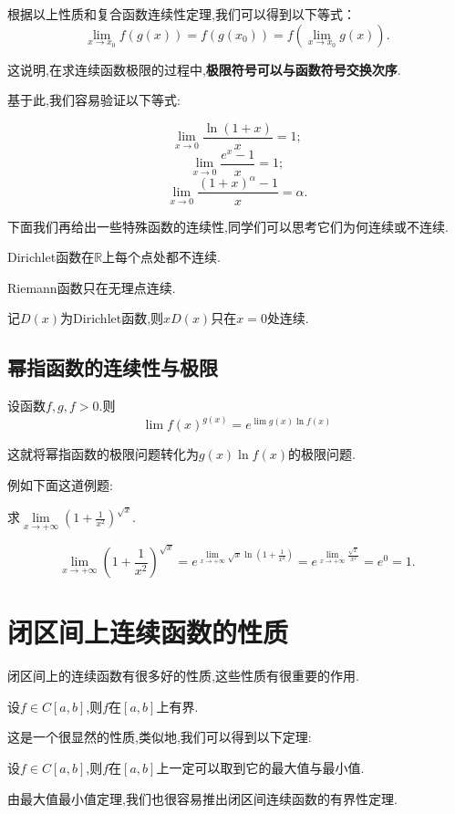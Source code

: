 根据以上性质和复合函数连续性定理,我们可以得到以下等式：
\[
	\lim_{x\to x_0}f(g(x))=f(g(x_0))=f(\lim_{x\to x_0}g(x)).
\]

这说明,在求连续函数极限的过程中,\textbf{极限符号可以与函数符号交换次序}.

基于此,我们容易验证以下等式:
\begin{example}
	\[
		\lim_{x\to 0}\frac{\ln{(1+x)}}{x}=1;
	\]\[
		\lim_{x\to 0}\frac{e^{x}-1}{x}=1;
	\]\[
		\lim_{x\to 0}\frac{(1+x)^{\alpha}-1}{x}=\alpha.
	\]
\end{example}

下面我们再给出一些特殊函数的连续性,同学们可以思考它们为何连续或不连续.
\begin{example}
	Dirichlet函数在$\mathbb{R}$上每个点处都不连续.
\end{example}
\begin{example}
	Riemann函数只在无理点连续.
\end{example}
\begin{example}
	记$D(x)$为Dirichlet函数,则$xD(x)$只在$x=0$处连续.
\end{example}

\subsection{幂指函数的连续性与极限}
设函数$f,g,f>0$.则
\[
	\lim f(x)^{g(x)}=e^{\lim g(x)\ln{f(x)}}
\]

这就将幂指函数的极限问题转化为$g(x)\ln f(x)$的极限问题.

例如下面这道例题:
\begin{example}
	求$\lim\limits_{x\to +\infty}(1+\frac{1}{x^2})^{\sqrt{x}}$.
\end{example}

\begin{solution}
	\[
		\lim_{x\to +\infty}(1+\frac{1}{x^2})^{\sqrt{x}}=e^{\lim\limits_{x\to +\infty}\sqrt{x}\ln{(1+\frac{1}{x^2})}}=e^{\lim\limits_{x\to +\infty}\frac{\sqrt{x}}{x^2}}=e^0=1.
	\]
\end{solution}

\section{闭区间上连续函数的性质}
闭区间上的连续函数有很多好的性质,这些性质有很重要的作用.
\begin{theorem}
	设$f\in C\left[a,b\right]$,则$f$在$\left[a,b\right]$上有界.
\end{theorem}
这是一个很显然的性质,类似地,我们可以得到以下定理:
\begin{theorem}
	设$f\in C\left[a,b\right]$,则$f$在$\left[a,b\right]$上一定可以取到它的最大值与最小值.
\end{theorem}
由最大值最小值定理,我们也很容易推出闭区间连续函数的有界性定理.

